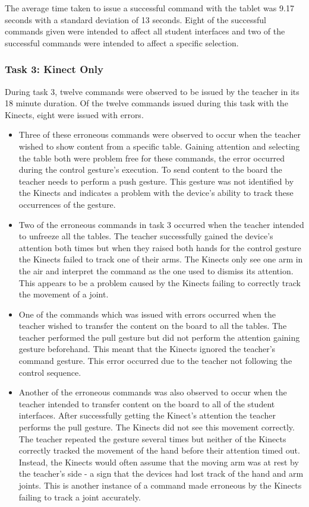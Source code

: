 \documentclass[link]{IWCOMP}
\begin{document}
The average time taken to issue a successful command with the tablet was 9.17 seconds with a standard deviation of 13 seconds.
Eight of the successful commands given were intended to affect all student interfaces and two of the successful commands were intended to affect a specific selection.

\subsubsection{Task 3: Kinect Only}
\label{subsubsec:studyPhase2ResultsTask3}

During task 3, twelve commands were observed to be issued by the teacher in its 18 minute duration.
Of the twelve commands issued during this task with the Kinects, eight were issued with errors.

\begin{itemize}
\item Three of these erroneous commands were observed to occur when the teacher wished to show content from a specific table.
Gaining attention and selecting the table both were problem free for these commands, the error occurred during the control gesture's execution.
To send content to the board the teacher needs to perform a push gesture.
This gesture was not identified by the Kinects and indicates a problem with the device's ability to track these occurrences of the gesture.

\item Two of the erroneous commands in task 3 occurred when the teacher intended to unfreeze all the tables.
The teacher successfully gained the device's attention both times but when they raised both hands for the control gesture the Kinects failed to track one of their arms.
The Kinects only see one arm in the air and interpret the command as the one used to dismiss its attention.
This appears to be a problem caused by the Kinects failing to correctly track the movement of a joint.

\item One of the commands which was issued with errors occurred when the teacher wished to transfer the content on the board to all the tables.
The teacher performed the pull gesture but did not perform the attention gaining gesture beforehand.
This meant that the Kinects ignored the teacher's command gesture.
This error occurred due to the teacher not following the control sequence.

\item Another of the erroneous commands was also observed to occur when the teacher intended to transfer content on the board to all of the student interfaces.
After successfully getting the Kinect's attention the teacher performs the pull gesture.
The Kinects did not see this movement correctly.
The teacher repeated the gesture several times but neither of the Kinects correctly tracked the movement of the hand before their attention timed out.
Instead, the Kinects would often assume that the moving arm was at rest by the teacher's side - a sign that the devices had lost track of the hand and arm joints.
This is another instance of a command made erroneous by the Kinects failing to track a joint accurately.


\end{itemize}
\end{document}
